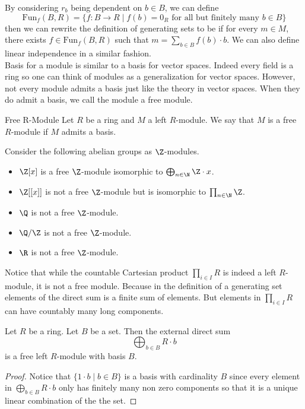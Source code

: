\documentclass[a4paper]{article}
\begin{document}
By considering $r_b$ being dependent on $b\in B$, we can define $$\text{Fun}_f(B,R)=\{f:B\to R\;|\;f(b)=0_R\text{ for all but finitely many }b\in B\}$$ then we can rewrite the definition of generating sets to be if for every $m\in M$, there exists $f\in\text{Fun}_f(B,R)$ such that $m=\sum_{b\in B}f(b)\cdot b$. We can also define linear independence in a similar fashion. \\

Basis for a module is similar to a basis for vector spaces. Indeed every field is a ring so one can think of modules as a generalization for vector spaces. However, not every module admits a basis just like the theory in vector spaces. When they do admit a basis, we call the module a free module. 

\begin{defn}{Free R-Module}{} Let $R$ be a ring and $M$ a left $R$-module. We say that $M$ is a free $R$-module if $M$ admits a basis. 
\end{defn}

\begin{eg}{}{} Consider the following abelian groups as $\Z$-modules. 
\begin{itemize}
\item $\Z[x]$ is a free $\Z$-module isomorphic to $\bigoplus_{n\in\N}\Z\cdot x$. 
\item $\Z[[x]]$ is not a free $\Z$-module but is isomorphic to $\prod_{n\in\N}\Z$. 
\item $\Q$ is not a free $\Z$-module. 
\item $\Q/\Z$ is not a free $\Z$-module. 
\item $\R$ is not a free $\Z$-module. 
\end{itemize}
\end{eg}

Notice that while the countable Cartesian product $\prod_{i\in I}R$ is indeed a left $R$-module, it is not a free module. Because in the definition of a generating set elements of the direct sum is a finite sum of elements. But elements in $\prod_{i\in I}R$ can have countably many long components. 

\begin{lmm}{}{} Let $R$ be a ring. Let $B$ be a set. Then the external direct sum $$\bigoplus_{b\in B}R\cdot b$$ is a free left $R$-module with basis $B$. \tcbline
\begin{proof}
Notice that $\{1\cdot b\;|\;b\in B\}$ is a basis with cardinality $B$ since every element in $\bigoplus_{b\in B}R\cdot b$ only has finitely many non zero components so that it is a unique linear combination of the the set. 
\end{proof}
\end{lmm}
\end{document}
